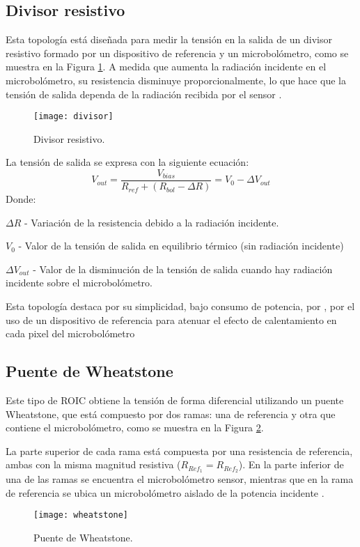 \subsection{Divisor resistivo} 
Esta topología está diseñada para medir la tensión en la salida de un divisor resistivo formado por un dispositivo de referencia y un microbolómetro, como se muestra en la Figura \ref{fig:divisor}. A medida que aumenta la radiación incidente en el microbolómetro, su resistencia disminuye proporcionalmente, lo que hace que la tensión de salida dependa de la radiación recibida por el sensor \cite{BlancoMDA}.
            \begin{figure}[hbtp]
                \centering
                \texttt{[image: divisor]}
                \caption{Divisor resistivo.}
                \label{fig:divisor}
            \end{figure}

La tensión de salida se expresa con la siguiente ecuación:
        \begin{equation}
        V_{out} =\frac{V_{bias}}{R_{ref} + (R_{bol} - \Delta R)} = V_{0} - \Delta V_{out}
        \label{eq:Divisor}
        \end{equation} 
Donde:


$\Delta R$ - Variación de la resistencia debido a la radiación incidente.


$V_{0}$ - Valor de la tensión de salida en equilibrio térmico (sin radiación incidente)


$\Delta V_{out}$ - Valor de la disminución de la tensión de salida cuando hay radiación incidente sobre el microbolómetro.


Esta topología destaca por su simplicidad, bajo consumo de potencia, por , por el uso de un dispositivo de referencia para atenuar el efecto de calentamiento en cada pixel del microbolómetro

\subsection{Puente de Wheatstone}
Este tipo de ROIC obtiene la tensión de forma diferencial utilizando un puente Wheatstone, que está compuesto por dos ramas: una de referencia y otra que contiene el microbolómetro, como se muestra en la Figura \ref{fig:wheatstone}.

La parte superior de cada rama está compuesta por una resistencia de referencia, ambas con la misma magnitud resistiva ($R_{Ref_1} = R_{Ref_2}$). En la parte inferior de una de las ramas se encuentra el microbolómetro sensor, mientras que en la rama de referencia se ubica un microbolómetro aislado de la potencia incidente \cite{BlancoMDA}.
            \begin{figure}[hbtp]
                \centering
                \texttt{[image: wheatstone]}
                \caption{Puente de Wheatstone.}
                \label{fig:wheatstone}
            \end{figure}

